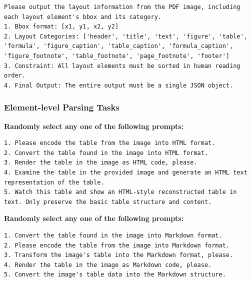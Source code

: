 \begin{tcolorbox}[
  colback=gray!5,
  colframe=gray!60,
  title={Prompt for layout analysis},
  fonttitle=\bfseries,
  breakable
]
\begin{lstlisting}[style=promptlisting, breakautoindent=false, breakindent=0pt]
Please output the layout information from the PDF image, including each layout element's bbox and its category.
1. Bbox format: [x1, y1, x2, y2]
2. Layout Categories: ['header', 'title', 'text', 'figure', 'table', 'formula', 'figure_caption', 'table_caption', 'formula_caption', 'figure_footnote', 'table_footnote', 'page_footnote', 'footer']
3. Constraint: All layout elements must be sorted in human reading order.
4. Final Output: The entire output must be a single JSON object.
\end{lstlisting}
\end{tcolorbox}

\subsubsection*{Element-level Parsing Tasks}

\begin{tcolorbox}[
  colback=gray!5,
  colframe=gray!60,
  title={Prompt for table2html},
  fonttitle=\bfseries,
  breakable
]
\textbf{Randomly select any one of the following prompts:} \\
\begin{lstlisting}[style=promptlisting, breakautoindent=false, breakindent=0pt]
1. Please encode the table from the image into HTML format.
2. Convert the table found in the image into HTML format.
3. Render the table in the image as HTML code, please.
4. Examine the table in the provided image and generate an HTML text representation of the table.
5. Watch this table and show an HTML-style reconstructed table in text. Only preserve the basic table structure and content.
\end{lstlisting}
\end{tcolorbox}

\begin{tcolorbox}[
  colback=gray!5,
  colframe=gray!60,
  title={Prompt for table2md},
  fonttitle=\bfseries,
  breakable
]
\textbf{Randomly select any one of the following prompts:} \\
\begin{lstlisting}[style=promptlisting, breakautoindent=false, breakindent=0pt]
1. Convert the table found in the image into Markdown format.  
2. Please encode the table from the image into Markdown format.  
3. Transform the image's table into the Markdown format, please.  
4. Render the table in the image as Markdown code, please.  
5. Convert the image's table data into the Markdown structure.  
\end{lstlisting}
\end{tcolorbox}

